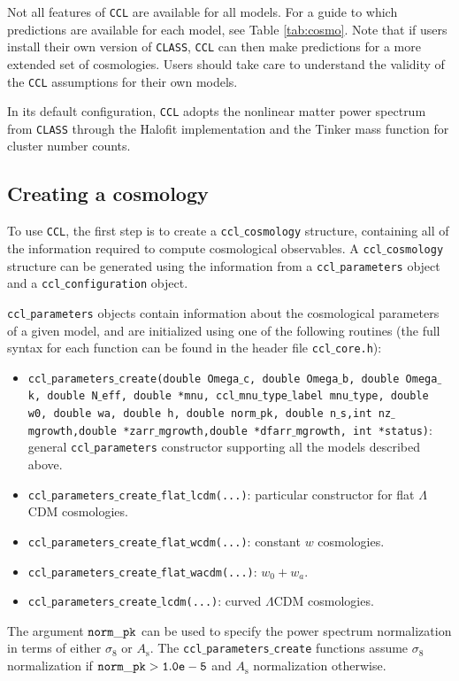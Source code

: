 \documentclass[\docopts]{\docclass}
\newcommand{\ccl}{{\tt CCL}\xspace}
\begin{document}
Not all features of \ccl are available for all models. For a guide to which predictions are available for each model, see Table \ref{tab:cosmo}. Note that if users install their own version of {\tt CLASS}, {\tt CCL} can then make predictions for a more extended set of cosmologies. Users should take care to understand the validity of the {\tt CCL} assumptions for their own models.

In its default configuration, \ccl adopts the nonlinear matter power spectrum from {\tt CLASS} through the Halofit implementation and the Tinker mass function for cluster number counts.

\subsection{Creating a cosmology}

To use \ccl, the first step is to create a {\tt ccl$\_$cosmology} structure, containing all of the information required to compute cosmological observables. A {\tt ccl$\_$cosmology} structure can be generated using the information from a {\tt ccl$\_$parameters} object and a {\tt ccl$\_$configuration} object.



{\tt ccl$\_$parameters} objects contain information about the cosmological parameters of a given model, and are initialized using one of the following routines (the full syntax for each function can be found in the header file {\tt ccl$\_$core.h}):
\begin{itemize}
 \item {\tt ccl$\_$parameters$\_$create(double Omega$\_$c, double Omega$\_$b, double Omega$\_$k, double N$\_$eff, double *mnu, ccl$\_$mnu$\_$type$\_$label mnu$\_$type, double w0, double wa, double h, double norm$\_$pk, double n$\_$s,int nz$\_$mgrowth,double *zarr$\_$mgrowth,double *dfarr$\_$mgrowth, int *status)}: general {\tt ccl$\_$parameters} constructor supporting all the models described above.
 \item {\tt ccl$\_$parameters$\_$create$\_$flat$\_$lcdm(...)}: particular constructor for flat $\Lambda$CDM cosmologies.
 \item {\tt ccl$\_$parameters$\_$create$\_$flat$\_$wcdm(...)}: constant $w$ cosmologies.
 \item {\tt ccl$\_$parameters$\_$create$\_$flat$\_$wacdm(...)}: $w_0+w_a$.
 \item {\tt ccl$\_$parameters$\_$create$\_$lcdm(...)}: curved $\Lambda$CDM cosmologies.
\end{itemize}
The argument ${\tt norm\_pk}$ can be used to specify the power spectrum normalization in terms of either $\sigma_8$ or $A_\mathrm{s}$. The {\tt ccl$\_$parameters$\_$create} functions assume $\sigma_8$ normalization if ${\tt norm\_pk > 1.0e-5}$ and $A_{\mathrm s}$ normalization otherwise.
\end{document}
